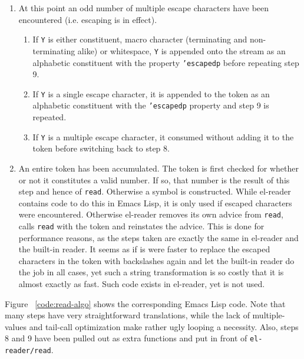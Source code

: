 \documentclass[a4paper,10pt,twoside]{report}
\newcommand{\el}{Emacs Lisp}
\newcommand{\elr}{el-reader}
\newcommand{\fun}[1]{\texttt{#1}}
\newcommand{\Read}{\fun{read}}
\begin{document}
\begin{enumerate}
\item At this point an odd number of multiple escape characters have been
  encountered (i.e. escaping is in effect). 
  \begin{enumerate}
  \item If \texttt{Y} is either constituent, macro character (terminating and
    non-terminating alike) or whitespace, \texttt{Y} is appended onto the stream
    as an alphabetic constituent with the property \texttt{'escapedp} before
    repeating step 9.
  \item If \texttt{Y} is a single escape character, it is appended to the token
    as an alphabetic constituent with the \texttt{'escapedp} property and step 9
    is repeated.
  \item If \texttt{Y} is a multiple escape character, it consumed without adding
    it to the token before switching back to step 8.
  \end{enumerate}
\item An entire token has been accumulated.  The token is first checked for
  whether or not it constitutes a valid number.  If so, that number is the
  result of this step and hence of \Read{}.  Otherwise a symbol is constructed.
  While \elr{} contains code to do this in \el{}, it is only used if escaped
  characters were encountered.  Otherwise \elr{} removes its own advice from
  \Read{}, calls \Read{} with the token and reinstates the advice.  This is done
  for performance reasons, as the steps taken are exactly the same in \elr{} and
  the built-in reader.  It seems as if is were faster to replace the escaped
  characters in the token with backslashes again and let the built-in reader do
  the job in all cases, yet such a string transformation is so costly that it is
  almost exactly as fast.  Such code exists in \elr{}, yet is not used.
\end{enumerate}

Figure ~\ref{code:read-algo} shows the corresponding \el{} code.  Note that many
steps have very straightforward translations, while the lack of multiple-values
and tail-call optimization make rather ugly looping a necessity.  Also, steps 8
and 9 have been pulled out as extra functions and put in front of
\fun{el-reader/read}. 
\end{document}
